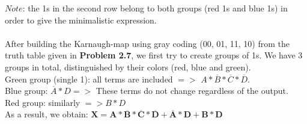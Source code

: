 \documentclass[a4paper]{article}
\begin{document}
$Note$: the 1s in the second row belong to both groups (red 1s and blue 1s) in order to give the minimalistic expression.
\\
\\
After building the Karnaugh-map using gray coding (00, 01, 11, 10) from the truth table given in \textbf{Problem 2.7}, we first try to create groups of 1s.
We have 3 groups in total, distinguished by their colors (red, blue and green).\\
Green group (single 1): all terms are included $=>$ $A * \overline{B} * \overline{C} * \overline{D}$.\\
Blue group: $\overline{A} * D =>$ These terms do not change regardless of the output.\\
Red group: similarly $=> B * D$\\
As a result, we obtain: $\mathbf{X = A * \overline{B} * \overline{C} * \overline{D} + \overline{A} * D + B * D} $\\
\end{document}
